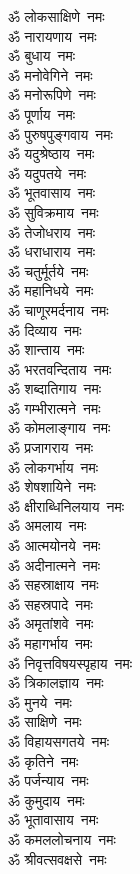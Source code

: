 \begin{multicols}{2}
\begin{flushleft}
ॐ लोकसाक्षिणे~नमः\\
ॐ नारायणाय~नमः\\
ॐ बुधाय~नमः\\
ॐ मनोवेगिने~नमः\\
ॐ मनोरूपिणे~नमः\\
ॐ पूर्णाय~नमः\hfill{}\\
ॐ पुरुषपुङ्गवाय~नमः\\
ॐ यदुश्रेष्ठाय~नमः\\
ॐ यदुपतये~नमः\\
ॐ भूतवासाय~नमः\\
ॐ सुविक्रमाय~नमः\\
ॐ तेजोधराय~नमः\\
ॐ धराधाराय~नमः\\
ॐ चतुर्मूर्तये~नमः\\
ॐ महानिधये~नमः\\
ॐ चाणूरमर्दनाय~नमः\hfill{}\\
ॐ दिव्याय~नमः\\
ॐ शान्ताय~नमः\\
ॐ भरतवन्दिताय~नमः\\
ॐ शब्दातिगाय~नमः\\
ॐ गम्भीरात्मने~नमः\\
ॐ कोमलाङ्गाय~नमः\\
ॐ प्रजागराय~नमः\\
ॐ लोकगर्भाय~नमः\\
ॐ शेषशायिने~नमः\\
ॐ क्षीराब्धिनिलयाय~नमः\hfill{}\\
ॐ अमलाय~नमः\\
ॐ आत्मयोनये~नमः\\
ॐ अदीनात्मने~नमः\\
ॐ सहस्राक्षाय~नमः\\
ॐ सहस्रपादे~नमः\\
ॐ अमृतांशवे~नमः\\
ॐ महागर्भाय~नमः\\
ॐ निवृत्तविषयस्पृहाय~नमः\\
ॐ त्रिकालज्ञाय~नमः\\
ॐ मुनये~नमः\hfill{}\\
ॐ साक्षिणे~नमः\\
ॐ विहायसगतये~नमः\\
ॐ कृतिने~नमः\\
ॐ पर्जन्याय~नमः\\
ॐ कुमुदाय~नमः\\
ॐ भूतावासाय~नमः\\
ॐ कमललोचनाय~नमः\\
ॐ श्रीवत्सवक्षसे~नमः\\

\end{flushleft}
\end{multicols}
